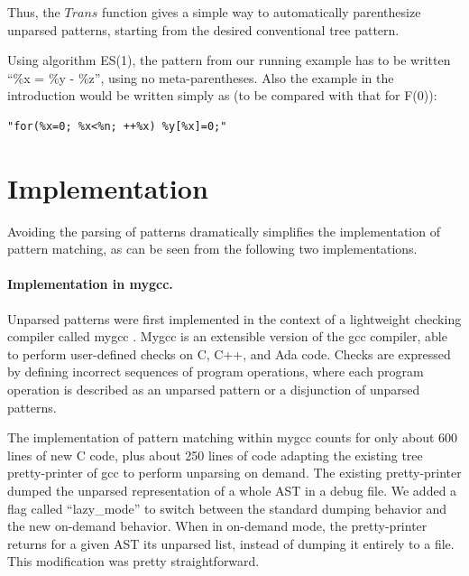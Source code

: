 \documentclass{sigplanconf}
\begin{document}
Thus, the $Trans$ function gives a simple way to automatically
parenthesize unparsed patterns, starting from the desired conventional
tree pattern.

Using algorithm ES(1), the pattern from our running example has to be
written ``\%x = \%y - \%z'', using no meta-parentheses. Also the
example in the introduction would be written simply as (to be compared
with that for F(0)):
\begin{verbatim} 
"for(%x=0; %x<%n; ++%x) %y[%x]=0;"
\end{verbatim}

\section{Implementation}
\label{implem}
Avoiding the parsing of patterns dramatically simplifies the
implementation of pattern matching, as can be seen from the following
two implementations.

\paragraph{Implementation in mygcc.}
Unparsed patterns were first implemented in the context of a
lightweight checking compiler called mygcc \cite{mygcc}. Mygcc is an
extensible version of the gcc compiler, able to perform user-defined
checks on C, C++, and Ada code. Checks are expressed by defining
incorrect sequences of program operations, where each program
operation is described as an unparsed pattern or a disjunction of
unparsed patterns.

The implementation of pattern matching within mygcc counts for only
about 600 lines of new C code, plus about 250 lines of code adapting
the existing tree pretty-printer of gcc to perform unparsing on
demand. The existing pretty-printer dumped the unparsed representation
of a whole AST in a debug file. We added a flag called ``lazy\_mode''
to switch between the standard dumping behavior and the new on-demand
behavior. When in on-demand mode, the pretty-printer returns for a
given AST its unparsed list, instead of dumping it entirely to a
file. This modification was pretty straightforward.
\end{document}
